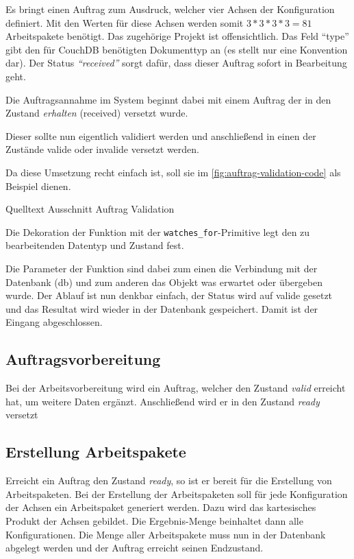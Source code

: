 Es bringt einen Auftrag zum Ausdruck, welcher vier Achsen der Konfiguration definiert.
Mit den Werten für diese Achsen werden somit $3*3*3*3 = 81$ Arbeitspakete benötigt.
Das zugehörige Projekt ist offensichtlich. Das Feld ``type'' gibt den für CouchDB benötigten Dokumenttyp an (es stellt nur eine Konvention dar).
Der Status \textit{``received''} sorgt dafür, dass dieser Auftrag sofort in Bearbeitung geht.

\FloatBarrier
Die Auftragsannahme im System beginnt dabei mit einem Auftrag der in den Zustand \textit{erhalten} (received) versetzt wurde.

Dieser sollte nun eigentlich validiert werden und anschließend in einen der Zustände valide oder invalide versetzt werden.

Da diese Umsetzung recht einfach ist, soll sie im \cref{fig:auftrag-validation-code} als Beispiel dienen.

\begin{listing}[h]
\caption{Quelltext Ausschnitt Auftrag Validation}
\label{fig:auftrag-validation-code}
\end{listing}

Die Dekoration \cite{python:decorator}
der Funktion mit der \verb|watches_for|-Primitive legt den zu bearbeitenden Datentyp und Zustand fest.

Die Parameter der Funktion sind dabei zum einen die Verbindung mit der Datenbank (db) und
zum anderen das Objekt was erwartet oder übergeben wurde.
Der Ablauf ist nun denkbar einfach, der Status wird auf valide gesetzt und das Resultat wird wieder in der Datenbank gespeichert.
Damit ist der Eingang abgeschlossen.

\FloatBarrier
\subsection{Auftragsvorbereitung}

Bei der Arbeitsvorbereitung wird ein Auftrag,
welcher den Zustand \textit{valid} erreicht hat, um weitere Daten ergänzt.
Anschließend wird er in den Zustand \textit{ready} versetzt

\subsection{Erstellung Arbeitspakete}

Erreicht ein Auftrag den Zustand \textit{ready}, so ist er bereit für die Erstellung von Arbeitspaketen.
Bei der Erstellung der Arbeitspaketen soll für jede Konfiguration der Achsen ein Arbeitspaket generiert werden.
Dazu wird das kartesisches Produkt der Achsen gebildet.
Die Ergebnis-Menge beinhaltet dann alle Konfigurationen.
Die Menge aller Arbeitspakete muss nun in der Datenbank abgelegt werden
und der Auftrag erreicht seinen Endzustand.

